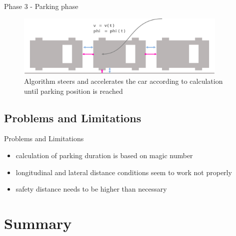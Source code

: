 \documentclass[aspectratio=169]{beamer}
\begin{document}
  \begin{frame}{Phase 3 - Parking phase}
  	\begin{figure} [ht]
  		\centering
  		\includegraphics[width=0.9\textwidth]{david_images/Parked.png}
  		\caption{\tiny Algorithm steers and accelerates the car according to calculation until parking position is reached}
	\end{figure}
  \end{frame}

  \subsection{Problems and Limitations}
  \begin{frame}{Problems and Limitations}
  	\begin{itemize}
  		\item<1-> calculation of parking duration is based on magic number
  		\item<2-> longitudinal and lateral distance conditions seem to work not properly
  		\item<3-> safety distance needs to be higher than necessary
  	\end{itemize}
  \end{frame}

\section{Summary}
\end{document}
